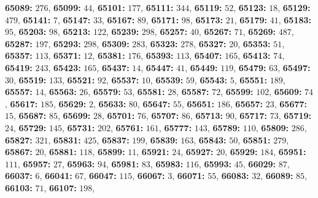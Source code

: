\textsf{\bfseries 65089:} $276$, \textsf{\bfseries 65099:} $44$, \textsf{\bfseries 65101:} $177$, \textsf{\bfseries 65111:} $344$, \textsf{\bfseries 65119:} $52$, \textsf{\bfseries 65123:} $18$, \textsf{\bfseries 65129:} $479$, \textsf{\bfseries 65141:} $7$, \textsf{\bfseries 65147:} $33$, \textsf{\bfseries 65167:} $89$, \textsf{\bfseries 65171:} $98$, \textsf{\bfseries 65173:} $21$, \textsf{\bfseries 65179:} $41$, \textsf{\bfseries 65183:} $95$, \textsf{\bfseries 65203:} $98$, \textsf{\bfseries 65213:} $122$, \textsf{\bfseries 65239:} $298$, \textsf{\bfseries 65257:} $40$, \textsf{\bfseries 65267:} $71$, \textsf{\bfseries 65269:} $487$, \textsf{\bfseries 65287:} $197$, \textsf{\bfseries 65293:} $298$, \textsf{\bfseries 65309:} $283$, \textsf{\bfseries 65323:} $278$, \textsf{\bfseries 65327:} $20$, \textsf{\bfseries 65353:} $51$, \textsf{\bfseries 65357:} $113$, \textsf{\bfseries 65371:} $12$, \textsf{\bfseries 65381:} $176$, \textsf{\bfseries 65393:} $113$, \textsf{\bfseries 65407:} $165$, \textsf{\bfseries 65413:} $74$, \textsf{\bfseries 65419:} $243$, \textsf{\bfseries 65423:} $165$, \textsf{\bfseries 65437:} $14$, \textsf{\bfseries 65447:} $41$, \textsf{\bfseries 65449:} $119$, \textsf{\bfseries 65479:} $63$, \textsf{\bfseries 65497:} $30$, \textsf{\bfseries 65519:} $133$, \textsf{\bfseries 65521:} $92$, \textsf{\bfseries 65537:} $10$, \textsf{\bfseries 65539:} $59$, \textsf{\bfseries 65543:} $5$, \textsf{\bfseries 65551:} $189$, \textsf{\bfseries 65557:} $14$, \textsf{\bfseries 65563:} $26$, \textsf{\bfseries 65579:} $53$, \textsf{\bfseries 65581:} $28$, \textsf{\bfseries 65587:} $72$, \textsf{\bfseries 65599:} $102$, \textsf{\bfseries 65609:} $74$, \textsf{\bfseries 65617:} $185$, \textsf{\bfseries 65629:} $2$, \textsf{\bfseries 65633:} $80$, \textsf{\bfseries 65647:} $55$, \textsf{\bfseries 65651:} $186$, \textsf{\bfseries 65657:} $23$, \textsf{\bfseries 65677:} $15$, \textsf{\bfseries 65687:} $85$, \textsf{\bfseries 65699:} $28$, \textsf{\bfseries 65701:} $76$, \textsf{\bfseries 65707:} $86$, \textsf{\bfseries 65713:} $90$, \textsf{\bfseries 65717:} $73$, \textsf{\bfseries 65719:} $24$, \textsf{\bfseries 65729:} $145$, \textsf{\bfseries 65731:} $202$, \textsf{\bfseries 65761:} $161$, \textsf{\bfseries 65777:} $143$, \textsf{\bfseries 65789:} $110$, \textsf{\bfseries 65809:} $286$, \textsf{\bfseries 65827:} $321$, \textsf{\bfseries 65831:} $425$, \textsf{\bfseries 65837:} $199$, \textsf{\bfseries 65839:} $163$, \textsf{\bfseries 65843:} $50$, \textsf{\bfseries 65851:} $279$, \textsf{\bfseries 65867:} $20$, \textsf{\bfseries 65881:} $118$, \textsf{\bfseries 65899:} $11$, \textsf{\bfseries 65921:} $24$, \textsf{\bfseries 65927:} $20$, \textsf{\bfseries 65929:} $184$, \textsf{\bfseries 65951:} $111$, \textsf{\bfseries 65957:} $27$, \textsf{\bfseries 65963:} $94$, \textsf{\bfseries 65981:} $83$, \textsf{\bfseries 65983:} $116$, \textsf{\bfseries 65993:} $45$, \textsf{\bfseries 66029:} $87$, \textsf{\bfseries 66037:} $6$, \textsf{\bfseries 66041:} $67$, \textsf{\bfseries 66047:} $115$, \textsf{\bfseries 66067:} $3$, \textsf{\bfseries 66071:} $55$, \textsf{\bfseries 66083:} $32$, \textsf{\bfseries 66089:} $85$, \textsf{\bfseries 66103:} $71$, \textsf{\bfseries 66107:} $198$, 

